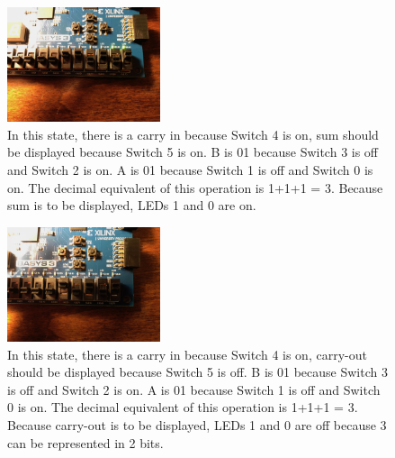 \documentclass[11pt]{article}
\begin{document}
\begin{figure}[H]
\begin{center}
	\includegraphics[width=0.4\textwidth]{./report-images/Part2/IMG_0471.jpg}
	\caption{\label{fig:BitMuxOnePlusOnePlusOneSum}In this state, there is a carry in because Switch 4 is on, sum should be displayed because Switch 5 is on. B is 01 because Switch 3 is off and Switch 2 is on. A is 01 because Switch 1 is off and Switch 0 is on. The decimal equivalent of this operation is 1+1+1 = 3. Because sum is to be displayed, LEDs 1 and 0 are on.}
\end{center}
\end{figure}

\begin{figure}[H]
\begin{center}
	\includegraphics[width=0.4\textwidth]{./report-images/Part2/IMG_0472.jpg}
	\caption{\label{fig:BitMuxOnePlusOnePlusOneOverFlow}In this state, there is a carry in because Switch 4 is on, carry-out should be displayed because Switch 5 is off. B is 01 because Switch 3 is off and Switch 2 is on. A is 01 because Switch 1 is off and Switch 0 is on. The decimal equivalent of this operation is 1+1+1 = 3. Because carry-out is to be displayed, LEDs 1 and 0 are off because 3 can be represented in 2 bits.}
\end{center}
\end{figure}
	
\end{document}
